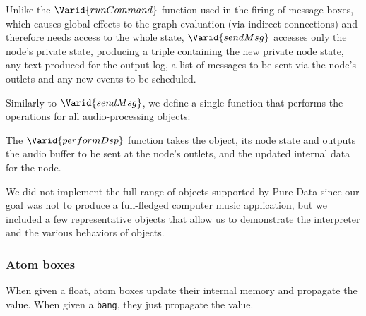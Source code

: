 Unlike the \ensuremath{\Varid{runCommand}} function used in the firing of message boxes,
which causes global effects to the graph evaluation (via indirect connections)
and therefore needs access to the whole state, \ensuremath{\Varid{sendMsg}} accesses
only the node's private state, producing a triple containing the new private
node state, any text produced for the output log, a list of messages to
be sent via the node's outlets and any new events to be scheduled.

Similarly to \ensuremath{\Varid{sendMsg}}, we define a single function that performs the
operations for all audio-processing objects:

\resethooks

The \ensuremath{\Varid{performDsp}} function takes the object, its node state and
outputs the audio buffer to be sent at the node's outlets, and the
updated internal data for the node.

We did not implement the full range of objects supported by Pure Data since
our goal was not to produce a full-fledged computer music application, but
we included a few representative objects that allow us to demonstrate the
interpreter and the various behaviors of objects.

\subsubsection{Atom boxes}

When given a float, atom boxes update their internal memory and propagate the
value. When given a \texttt{bang}, they just propagate the value.

